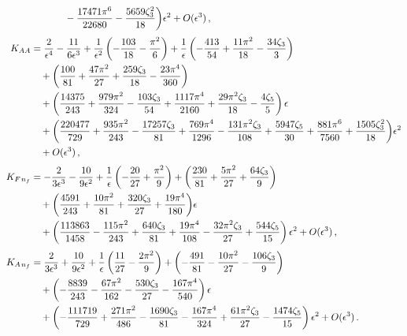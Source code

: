 \documentclass[12pt]{article}
\newcommand{\spac}{{\hspace{0.3mm}}}
\numberwithin{equation}{section}
\begin{document}
\begin{appendix}
\begin{align}
   &\hspace{1.23cm} -\frac{17471 \pi ^6}{22680}-\frac{5659 \zeta _3^2}{18}\bigg) \epsilon ^2
    +O(\epsilon^3) \,, \\[1mm]
%
   K_{AA} &= \frac{2}{\epsilon ^4}-\frac{11}{6 \epsilon ^3}
    +\frac{1}{\epsilon ^2}\left(-\frac{103}{18}-\frac{\pi ^2}{6}\right)
    +\frac{1}{\epsilon}\left(-\frac{413}{54}+\frac{11 \pi^2}{18}-\frac{34 \zeta _3}{3}\right) \notag\\
   &\quad +\bigg(\frac{100}{81}+\frac{47 \pi^2}{27}+\frac{259 \zeta _3}{18}-\frac{23 \pi ^4}{360}\bigg) \notag\\
   &\quad +\left(\frac{14375}{243}+\frac{979 \pi ^2}{324}-\frac{103 \zeta _3}{54}+\frac{1117 \pi^4}{2160}
    +\frac{29 \pi ^2 \zeta _3}{18}-\frac{4 \zeta _5}{5}\right) \epsilon \notag\\
   &\quad +\bigg(\frac{220477}{729}+\frac{935 \pi^2}{243}-\frac{17257\zeta _3}{81}
    +\frac{769 \pi ^4}{1296}-\frac{131 \pi^2\zeta _3}{108} +\frac{5947 \zeta _5}{30}
    +\frac{881 \pi ^6}{7560}  +\frac{1505 \zeta _3^2}{18}\bigg) \epsilon ^2 \notag\\
   &\quad +O(\epsilon^3) \,, \\[1mm]
%
   K_{F\spac n_f} &= -\frac{2}{3 \epsilon ^3}-\frac{10}{9 \epsilon ^2}
    +\frac{1}{\epsilon }\left(-\frac{20}{27}+\frac{\pi^2}{9}\right)
    +\left(\frac{230}{81}+\frac{5 \pi^2}{27}+\frac{64 \zeta _3}{9}\right) \notag\\
   &\quad +\bigg(\frac{4591}{243}+\frac{10 \pi ^2}{81}
    +\frac{320 \zeta _3}{27}+\frac{19 \pi ^4}{180}\bigg) \epsilon \notag\\
   &\quad +\left(\frac{113863}{1458}-\frac{115 \pi^2}{243}+\frac{640\zeta _3}{81}+\frac{19 \pi ^4}{108}
    -\frac{32 \pi ^2\zeta _3}{27} +\frac{544 \zeta _5}{15}\right) \epsilon ^2 
    + O(\epsilon^3) \,, \\[1mm]
%
   K_{A\spac n_f} &= \frac{2}{3 \epsilon ^3}+\frac{10}{9 \epsilon ^2}
    +\frac{1}{\epsilon}\left(\frac{11}{27}-\frac{2 \pi ^2}{9}\right)
    +\left(-\frac{491}{81}-\frac{10\pi^2}{27}-\frac{106\zeta_3}{9}\right) \notag\\
   &\quad +\left(-\frac{8839}{243}-\frac{67 \pi^2}{162}-\frac{530 \zeta _3}{27}
    -\frac{167 \pi ^4}{540}\right)\epsilon \notag\\
   &\quad +\left(-\frac{111719}{729}+\frac{271 \pi^2}{486}-\frac{1690 \zeta _3}{81}-\frac{167 \pi ^4}{324}
    +\frac{61 \pi ^2 \zeta _3}{27}-\frac{1474 \zeta _5}{15}\right) \epsilon ^2
    +O(\epsilon^3) \,.
\end{align}

\end{appendix}
\end{document}
